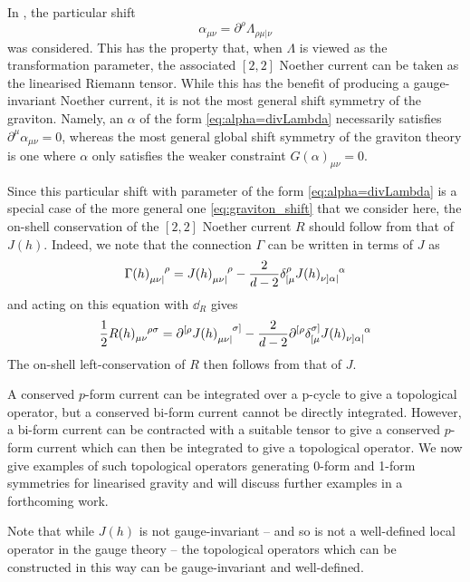 In \cite{Hinterbichler2023GravitySymmetries}, the particular shift 
\begin{equation}\label{eq:alpha=divLambda}
    \alpha_{\mu\nu} = \partial^\rho \Lambda_{\rho\mu|\nu}
\end{equation}
was considered.
This has the property that, when $\Lambda$ is viewed as the transformation parameter, the associated $[2,2]$ Noether current can be taken as the linearised Riemann tensor.
While this has the benefit of producing a gauge-invariant Noether current, it is not the most general shift symmetry of the graviton. Namely, an $\alpha$ of the form \eqref{eq:alpha=divLambda} necessarily satisfies $\partial^\mu \alpha_{\mu\nu}=0$, whereas the most general global shift symmetry of the graviton theory is one where $\alpha$ only satisfies the weaker constraint $G(\alpha)_{\mu\nu}=0$.

Since this particular shift with parameter of the form \eqref{eq:alpha=divLambda} is a special case of the more general one \eqref{eq:graviton_shift} that we consider here, the on-shell conservation of the $[2,2]$ Noether current $R$ should follow from that of $J(h)$. 
Indeed, we note that the connection $\Gamma$ can be written in terms of $J$ as
\begin{equation}
    \Gamma(h)\indices{_{\mu\nu|}^\rho} = J(h)\indices{_{\mu\nu|}^\rho} - \frac{2}{d-2} \delta^{\rho}_{[\mu} J(h)\indices{_{\nu]\alpha|}^\alpha}
\end{equation}
and acting on this equation with $\dd_R$ gives
\begin{equation}\label{eq:X_def}
    \frac{1}{2} R(h)\indices{_{\mu\nu}^{\rho\sigma}} = \partial^{[\rho} J(h)\indices{_{\mu\nu|}^{\sigma]}} - \frac{2}{d-2} \partial^{[\rho}\delta^{\sigma]}_{[\mu} J(h)\indices{_{\nu]\alpha|}^\alpha}
\end{equation}
The on-shell left-conservation of $R$ then follows from that of $J$.

A conserved $p$-form current can be integrated over a p-cycle to give a topological operator, but a conserved bi-form current cannot be directly integrated. However, a bi-form current can be contracted with a suitable tensor to give a conserved $p$-form current which can then be integrated to give a topological operator. We now give examples of such topological operators generating 0-form and 1-form symmetries for linearised gravity and will discuss further examples in a forthcoming work.

Note that while $J(h)$ is not gauge-invariant -- and so is not a well-defined local operator in the gauge theory -- the topological operators which can be constructed in this way can be gauge-invariant and well-defined.

